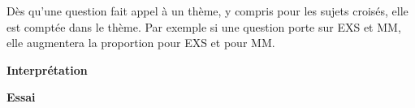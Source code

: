 {\begin{minipage}[t]{0.5\textwidth}
\begin{tcolorbox}
        {\scriptsize{Dès qu'une question fait appel à un thème, y compris pour les sujets croisés, elle est comptée dans le thème. Par exemple si une question porte sur EXS et MM, elle augmentera la proportion pour EXS et pour MM.}}
    \end{tcolorbox}
\end{minipage}%
\hfill%
\begin{minipage}[t]{0.85\textwidth}
    \vspace{0pt}
    \begin{tcolorbox}[
    	height=0.49\textheight,
        colback=red!15, 
        colframe=black, 
        sharp corners, 
        boxrule=0.5pt
    ]
        \begin{minipage}{0.45\textwidth}
            \begin{center} %
            \end{center}
        \end{minipage}%
        \hfill%
        \begin{minipage}{0.5\textwidth}
            \textbf{Interprétation}\\
            
            \vspace{0.1cm} %
            
            \textbf{Essai}\\
        \end{minipage}
        
        \vspace{-0.8cm} %
        

\end{tcolorbox}
\end{minipage}}
